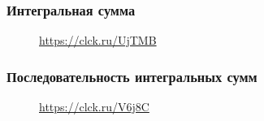 \documentclass{article}
\begin{document}
\subsubsection{Интегральная сумма}
\begin{figure}[h!]
\caption*{\url{https://clck.ru/UjTMB}}
\end{figure}
\subsubsection{Последовательность интегральных сумм}

\begin{figure}[h!]
\caption*{\url{https://clck.ru/V6j8C}}
\end{figure}
\newpage
\Large
\end{document}
